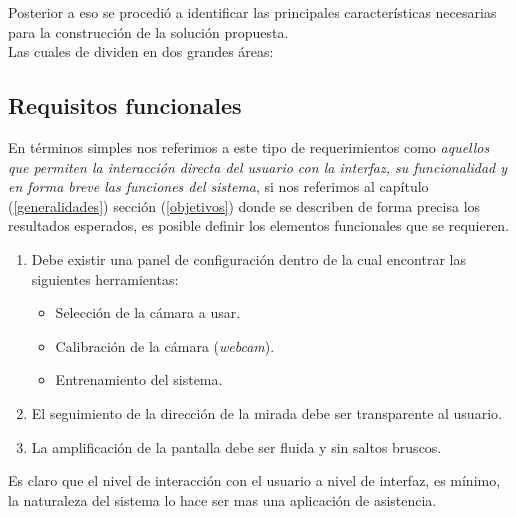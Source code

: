\documentclass[12pt]{book} %
\begin{document}
	Posterior a eso se procedió a identificar las principales características necesarias para la construcción de la solución propuesta.\\
	Las cuales de dividen en dos grandes áreas:
	\subsection{Requisitos funcionales \label{funcionales}}
		En términos simples nos referimos a este tipo de requerimientos como \textit{aquellos que permiten la interacción directa del usuario
		con la interfaz, su funcionalidad y en forma breve las funciones del sistema}, si nos referimos al capítulo (\ref{generalidades}) sección
		(\ref{objetivos}) donde se describen de forma precisa los resultados esperados, es posible definir los elementos funcionales que se requieren.
		
		\begin{enumerate}
			\item Debe existir una panel de configuración dentro de la cual encontrar las siguientes herramientas:
				\begin{itemize}
					\item Selección de la cámara a usar.
					\item Calibración de la cámara (\textit{webcam}).
					\item Entrenamiento del sistema.
				\end{itemize}
		\item El seguimiento de la dirección de la mirada debe ser transparente al usuario.
			\item La amplificación de la pantalla debe ser fluida y sin saltos bruscos.
			
		\end{enumerate}
		
		Es claro que el nivel de interacción con el usuario a nivel de interfaz, es mínimo, la naturaleza del sistema lo hace ser mas una 
		aplicación de asistencia.
		
\end{document}
